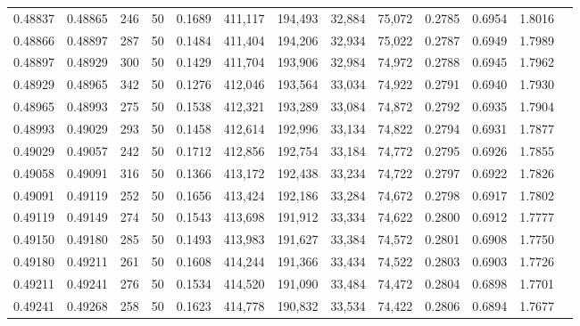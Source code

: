 \begin{tabular}{rrrrrrrrrrrrr}
0.48837 & 0.48865 &   246 &  50 &                                     0.1689 & 411,117 & 194,493 &  32,884 &  75,072 & 0.2785 & 0.6954 & 1.8016 \\
0.48866 & 0.48897 &   287 &  50 &                                     0.1484 & 411,404 & 194,206 &  32,934 &  75,022 & 0.2787 & 0.6949 & 1.7989 \\
0.48897 & 0.48929 &   300 &  50 &                                     0.1429 & 411,704 & 193,906 &  32,984 &  74,972 & 0.2788 & 0.6945 & 1.7962 \\
0.48929 & 0.48965 &   342 &  50 &                                     0.1276 & 412,046 & 193,564 &  33,034 &  74,922 & 0.2791 & 0.6940 & 1.7930 \\
0.48965 & 0.48993 &   275 &  50 &                                     0.1538 & 412,321 & 193,289 &  33,084 &  74,872 & 0.2792 & 0.6935 & 1.7904 \\
0.48993 & 0.49029 &   293 &  50 &                                     0.1458 & 412,614 & 192,996 &  33,134 &  74,822 & 0.2794 & 0.6931 & 1.7877 \\
0.49029 & 0.49057 &   242 &  50 &                                     0.1712 & 412,856 & 192,754 &  33,184 &  74,772 & 0.2795 & 0.6926 & 1.7855 \\
0.49058 & 0.49091 &   316 &  50 &                                     0.1366 & 413,172 & 192,438 &  33,234 &  74,722 & 0.2797 & 0.6922 & 1.7826 \\
0.49091 & 0.49119 &   252 &  50 &                                     0.1656 & 413,424 & 192,186 &  33,284 &  74,672 & 0.2798 & 0.6917 & 1.7802 \\
0.49119 & 0.49149 &   274 &  50 &                                     0.1543 & 413,698 & 191,912 &  33,334 &  74,622 & 0.2800 & 0.6912 & 1.7777 \\
0.49150 & 0.49180 &   285 &  50 &                                     0.1493 & 413,983 & 191,627 &  33,384 &  74,572 & 0.2801 & 0.6908 & 1.7750 \\
0.49180 & 0.49211 &   261 &  50 &                                     0.1608 & 414,244 & 191,366 &  33,434 &  74,522 & 0.2803 & 0.6903 & 1.7726 \\
0.49211 & 0.49241 &   276 &  50 &                                     0.1534 & 414,520 & 191,090 &  33,484 &  74,472 & 0.2804 & 0.6898 & 1.7701 \\
0.49241 & 0.49268 &   258 &  50 &                                     0.1623 & 414,778 & 190,832 &  33,534 &  74,422 & 0.2806 & 0.6894 & 1.7677 \\

\end{tabular}

